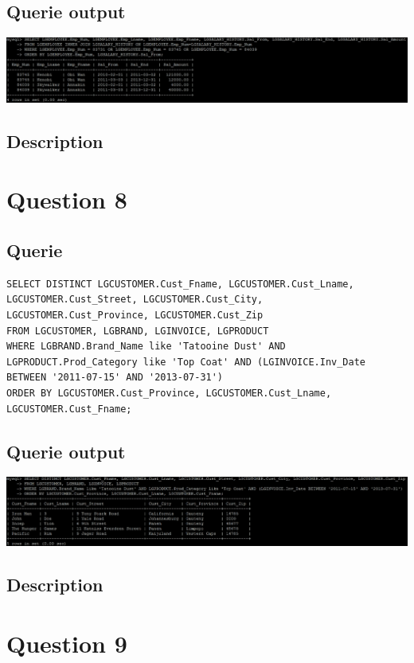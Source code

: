 \documentclass[a4paper,10pt]{article}
\begin{document}
\subsection{Querie output}
           \includegraphics{Queries/Question_7/Q7_screenshot.jpg}
\subsection{Description}\section*{Question 8}
 \subsection{Querie}
          \lstset{
            language=SQL,
            breaklines=true
            }
        \begin{lstlisting}[frame=single]
        SELECT DISTINCT LGCUSTOMER.Cust_Fname, LGCUSTOMER.Cust_Lname, LGCUSTOMER.Cust_Street, LGCUSTOMER.Cust_City, LGCUSTOMER.Cust_Province, LGCUSTOMER.Cust_Zip
FROM LGCUSTOMER, LGBRAND, LGINVOICE, LGPRODUCT
WHERE LGBRAND.Brand_Name like 'Tatooine Dust' AND LGPRODUCT.Prod_Category like 'Top Coat' AND (LGINVOICE.Inv_Date BETWEEN '2011-07-15' AND '2013-07-31')
ORDER BY LGCUSTOMER.Cust_Province, LGCUSTOMER.Cust_Lname, LGCUSTOMER.Cust_Fname;

        \end{lstlisting}
\subsection{Querie output}
           \includegraphics{Queries/Question_8/Q8_screenshot.jpg}
\subsection{Description}\section*{Question 9}
\end{document}
